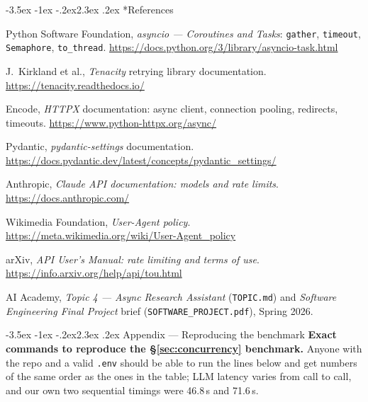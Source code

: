 \documentclass[11pt,a4paper]{article}
\makeatletter
\renewcommand\section{\@startsection{section}{1}{\z@}%
    {-3.5ex \@plus -1ex \@minus -.2ex}{2.3ex \@plus .2ex}%
    {\normalfont\Large\bfseries\color{accent}}}%
\makeatother
\begin{document}
\section*{References}

\begin{enumerate}[label={[\arabic*]},leftmargin=2.4em,itemsep=2pt]
  \item Python Software Foundation, \emph{asyncio --- Coroutines and Tasks}: \texttt{gather}, \texttt{timeout}, \texttt{Semaphore}, \texttt{to\_thread}. \url{https://docs.python.org/3/library/asyncio-task.html}
  \item J.~Kirkland et al., \emph{Tenacity} retrying library documentation. \url{https://tenacity.readthedocs.io/}
  \item Encode, \emph{HTTPX} documentation: async client, connection pooling, redirects, timeouts. \url{https://www.python-httpx.org/async/}
  \item Pydantic, \emph{pydantic-settings} documentation. \url{https://docs.pydantic.dev/latest/concepts/pydantic_settings/}
  \item Anthropic, \emph{Claude API documentation: models and rate limits}. \url{https://docs.anthropic.com/}
  \item Wikimedia Foundation, \emph{User-Agent policy}. \url{https://meta.wikimedia.org/wiki/User-Agent_policy}
  \item arXiv, \emph{API User's Manual: rate limiting and terms of use}. \url{https://info.arxiv.org/help/api/tou.html}
  \item AI Academy, \emph{Topic 4 --- Async Research Assistant} (\texttt{TOPIC.md}) and \emph{Software Engineering Final Project} brief (\texttt{SOFTWARE\_PROJECT.pdf}), Spring 2026.
\end{enumerate}

\appendix
\section{Appendix --- Reproducing the benchmark}
\textbf{Exact commands to reproduce the \S\ref{sec:concurrency} benchmark.} Anyone with the repo and a valid \texttt{.env} should be able to run the lines below and get numbers of the same order as the ones in the table; LLM latency varies from call to call, and our own two sequential timings were 46.8\,s and 71.6\,s.
\end{document}
